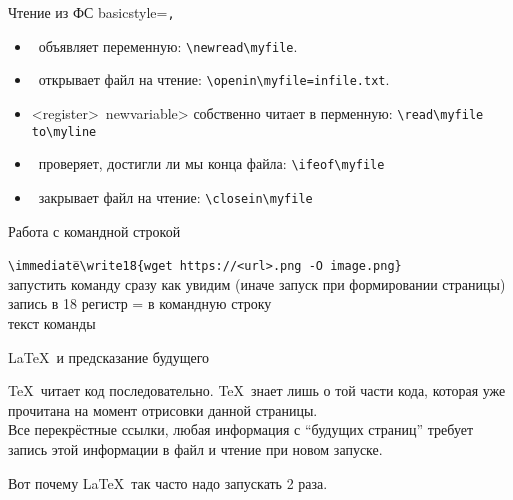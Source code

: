 \begin{frame}[fragile]{Чтение из ФС}\relax
     \lstset
    {
        basicstyle=\tt\normalsize,
    }
    \begin{itemize}
        \item \ccol\newread\ объявляет переменную: \lstinline|\newread\myfile|.
        \item \ccol\openin\ открывает файл на чтение:  \lstinline|\openin\myfile=infile.txt|.
        \item \ccol\read<register>\ \string\<newvariable> собственно читает в перменную: \lstinline|\read\myfile to\myline|
        \item \ccol\ifeof\ проверяет, достигли ли мы конца файла: \lstinline|\ifeof\myfile|
        \item \ccol\closein\ закрывает файл на чтение: \lstinline|\closein\myfile|
    \end{itemize}
\end{frame}

\begin{frame}[fragile]{Работа с командной строкой\magicPage}\relax
    \footnotesize
    \begin{tabbing} 
        \lstinline|\immediate|\= \lstinline|\write18|\= \lstinline|{wget https://<url>.png -O image.png}|\\ 
        \footnotesize запустить команду сразу как увидим \tiny(иначе запуск при формировании страницы) \> \> \\ 
        \> \footnotesize запись в 18 регистр = в командную строку \> \\
        \> \> \footnotesize текст команды \\ 
    \end{tabbing}

    \cprotect{}
\end{frame}

\begin{frame}{\LaTeX\ и предсказание будущего}\relax

\TeX\ читает код последовательно. \TeX\ знает лишь о той части кода, которая уже прочитана на момент отрисовки данной страницы.\\

Все перекрёстные ссылки, любая информация с ``будущих страниц'' требует запись этой информации в файл и чтение при новом запуске.

Вот почему \LaTeX\ так часто надо запускать 2 раза.
    
\end{frame}

